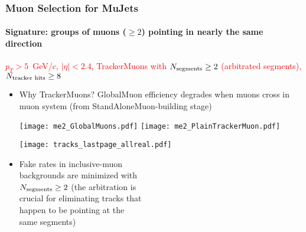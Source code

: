 \documentclass[compress]{beamer}
\newcommand{\s}[1]{{\mbox{\scriptsize #1}}}
\begin{document}

\small

\begin{frame}
\frametitle{Muon Selection for MuJets}
\framesubtitle{Signature: groups of muons ($\ge 2$) pointing in nearly the same direction}

\textcolor{red}{$p_T > 5$~GeV/$c$, $|\eta| < 2.4$, TrackerMuons with $N_\s{segments} \ge 2$ (arbitrated segments), $N_\s{tracker hits} \ge 8$}

\begin{itemize}
\item Why TrackerMuons?  GlobalMuon efficiency degrades when muons cross in muon system (from StandAloneMuon-building stage)

\texttt{[image: me2\_GlobalMuons.pdf]}
\texttt{[image: me2\_PlainTrackerMuon.pdf]}

\hfill \texttt{[image: tracks\_lastpage\_allreal.pdf]}

\vspace{-3 cm}
\item Fake rates in inclusive-muon \\ backgrounds are minimized with \\ $N_\s{segments} \ge 2$ (the arbitration is \\ crucial for eliminating tracks that \\ happen to be pointing at the \\ same segments)
\end{itemize}

\label{numpages}
\end{frame}



\end{document}
